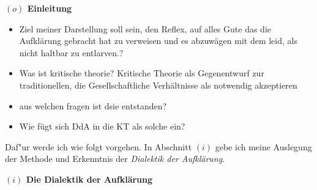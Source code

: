 \documentclass[a4paper, 12pt]{article}
\begin{document}
\begin{onehalfspace} 

\noindent\textbf{$(o)$ Einleitung}

\noindent %

\begin{itemize}

\item Ziel meiner Darstellung soll sein, den Reflex, auf alles Gute das die Aufklärung gebracht hat zu verweisen und es abzuwägen mit dem leid, als nicht haltbar zu entlarven.?
   \item Was ist kritische theorie? Kritische Theorie als Gegenentwurf zur traditionellen, die Gesellschaftliche Verhältnisse als notwendig akzeptieren
  \item aus welchen fragen ist dsie entstanden?
  \item Wie fügt sich DdA in die KT als solche ein?
\end{itemize}


Daf"ur werde ich wie folgt vorgehen. In Abschnitt $(i)$ gebe ich meine Auslegung der Methode und Erkenntnis der \emph{Dialektik der Aufklärung}. 

\vspace{5mm}


\noindent\textbf{$(i)$ Die Dialektik der Aufklärung}


\end{onehalfspace}
\end{document}
